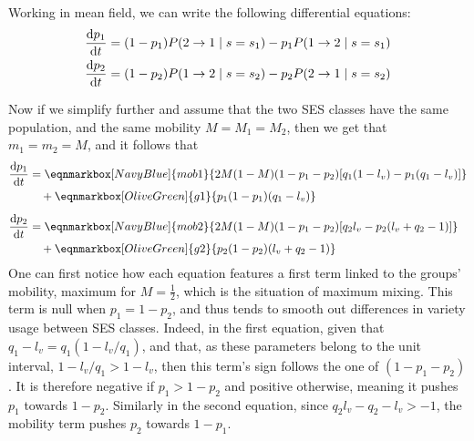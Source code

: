 \documentclass[../thesis.tex]{subfiles}
\begin{document}
Working in mean field, we can write the following differential equations:
\begin{equation}
    \label{eq:time_evol}
    \begin{aligned}
        \dv{p_1}{t} 
            &= (1 - p_1) P(2 \rightarrow 1 \mid s = s_1)
                - p_1 P(1 \rightarrow 2 \mid s = s_1)
        \\
        \dv{p_2}{t} 
            &= (1 - p_2) P(1 \rightarrow 2 \mid s = s_2)
                 - p_2 P(2 \rightarrow 1 \mid s = s_2)
    \end{aligned}
\end{equation}

Now if we simplify further and assume that the two \ac{SES} classes have the same
population, and the same mobility $M = M_1 = M_2$, then we get that $m_1 = m_2 = M$, and
it follows that
\begin{equation}
  \label{eq:time_evol_eq_mob}
  \begin{aligned}
      \dv{p_1}{t} 
          &= \eqnmarkbox[NavyBlue]{mob1}{
            2 M (1 - M) (1 - p_1 - p_2) [q_1 (1 - l_v) - p_1 (q_1 - l_v)]
          }
      \\
          & \quad + \eqnmarkbox[OliveGreen]{g1}{p_1 (1 - p_1) (q_1 - l_v)}
      \\[5pt]
      \dv{p_2}{t} 
          &= \eqnmarkbox[NavyBlue]{mob2}{
            2 M (1 - M) (1 - p_1 - p_2) [q_2 l_v - p_2 (l_v + q_2 - 1)]
          }
      \\
          & \quad + \eqnmarkbox[OliveGreen]{g2}{p_2 (1 - p_2) (l_v + q_2 - 1)}
  \end{aligned}
\end{equation}
One can first notice how each equation features a first term linked to the groups'
mobility, maximum for $M = \frac{1}{2}$, which is the situation of maximum mixing. This
term is null when $p_1 = 1 - p_2$, and thus tends to smooth out differences in variety
usage between \ac{SES} classes. Indeed, in the first equation, given that $q_1 - l_v =
q_1 (1 - l_v / q_1)$, and that, as these parameters belong to the unit interval, $1 -
l_v / q_1 > 1 - l_v$, then this term's sign follows the one of $(1 - p_1 - p_2)$. It is
therefore negative if $p_1 > 1 - p_2$ and positive otherwise, meaning it pushes $p_1$
towards $1 - p_2$. Similarly in the second equation, since $q_2 l_v - q_2 - l_v > -1$,
the mobility term pushes $p_2$ towards $1 - p_1$.
\end{document}

